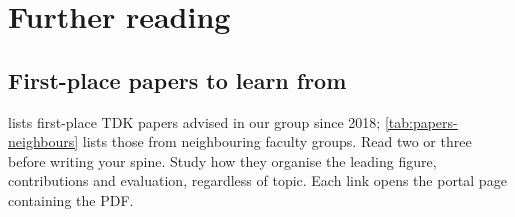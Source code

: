 \chapter{Further reading}\label{app:reading}
\section{First-place papers to learn from}\label{app:tdk:papers}
 lists first-place TDK papers advised in our group since 2018; \cref{tab:papers-neighbours} lists those from neighbouring faculty groups. Read two or three before writing your spine. Study how they organise the leading figure, contributions and evaluation, regardless of topic. Each link opens the portal page containing the PDF.


